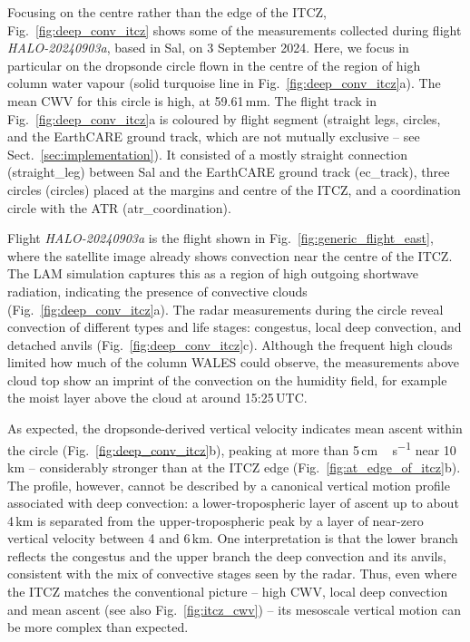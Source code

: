 \documentclass[acp, manuscript]{copernicus}
\begin{document}
Focusing on the centre rather than the edge of the ITCZ, Fig.~\ref{fig:deep_conv_itcz} shows some of the measurements collected during flight \textit{HALO-20240903a}, based in Sal, on 3 September 2024. Here, we focus in particular on the dropsonde circle flown in the centre of the region of high column water vapour (solid turquoise line in Fig.~\ref{fig:deep_conv_itcz}a). The mean CWV for this circle is high, at 59.61\,\unit{mm}. The flight track in Fig.~\ref{fig:deep_conv_itcz}a is coloured by flight segment (straight legs, circles, and the EarthCARE ground track, which are not mutually exclusive -- see Sect.~\ref{sec:implementation}). It consisted of a mostly straight connection (straight\_leg) between Sal and the EarthCARE ground track (ec\_track), three circles (circles) placed at the margins and centre of the ITCZ, and a coordination circle with the ATR (atr\_coordination).

Flight \textit{HALO-20240903a} is the flight shown in Fig.~\ref{fig:generic_flight_east}, where the satellite image already shows convection near the centre of the ITCZ. The LAM simulation captures this as a region of high outgoing shortwave radiation, indicating the presence of convective clouds (Fig.~\ref{fig:deep_conv_itcz}a). The radar measurements during the circle reveal convection of different types and life stages: congestus, local deep convection, and detached anvils (Fig.~\ref{fig:deep_conv_itcz}c). Although the frequent high clouds limited how much of the column WALES could observe, the measurements above cloud top show an imprint of the convection on the humidity field, for example the moist layer above the cloud at around 15:25\,UTC.

As expected, the dropsonde-derived vertical velocity indicates mean ascent within the circle (Fig.~\ref{fig:deep_conv_itcz}b), peaking at more than 5\,\unit{cm\,s^{-1}} near 10\,\unit{km} -- considerably stronger than at the ITCZ edge (Fig.~\ref{fig:at_edge_of_itcz}b). The profile, however, cannot be described by a canonical vertical motion profile associated with deep convection: a lower-tropospheric layer of ascent up to about 4\,\unit{km} is separated from the upper-tropospheric peak by a layer of near-zero vertical velocity between 4 and 6\,\unit{km}. One interpretation is that the lower branch reflects the congestus and the upper branch the deep convection and its anvils, consistent with the mix of convective stages seen by the radar. Thus, even where the ITCZ matches the conventional picture -- high CWV, local deep convection and mean ascent (see also Fig.~\ref{fig:itcz_cwv}) -- its mesoscale vertical motion can be more complex than expected. 
\end{document}
